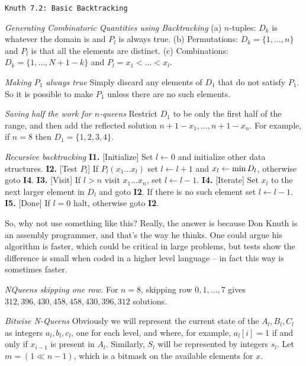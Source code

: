 \topglue 0.5in
\centerline{\tt Knuth 7.2: Basic Backtracking}
\vskip 0.3in

 {\it Generating Combinatoric Quantities using 
Backtracking}\hfil\break
(a) $n$-tuples: $D_k$ is whatever the domain is and $P_l$ is always 
true.\hfil\break 
(b) Permutations: $D_k = \{ 1, \ldots, n \}$ and $P_l$ is that all the elements 
are distinct.\hfil\break
(c) Combinations: $D_k = \{1, \ldots, N + 1 - k \}$ and 
$P_l = x_1 < \ldots < x_l$.\hfil\break

 {\it Making $P_1$ always true}\hfil\break
Simply discard any elements of $D_1$ that do not satisfy $P_1$.
So it is possible to make $P_1$ unless there are no such elements.

 {\it Saving half the work for $n$-queens}\hfil\break
Restrict $D_1$ to be only the first half of the range, and then add the 
reflected solution $n + 1 - x_1, \ldots, n + 1 - x_n$.  For example, if $n = 8$
then $D_1 = \{1, 2, 3, 4\}$.

 {\it Recursive backtracking}\hfil\break
{\bf I1.} [Initialize] Set $l \leftarrow 0$ and initialize other data 
structures.\hfil\break
{\bf I2.} [Test $P_l$] If $P_l\left(x_1 \ldots x_l\right)$ set 
 $l \leftarrow l + 1$ and $x_l \leftarrow {\rm min}\,D_l$,
  otherwise goto {\bf I4}.\hfil\break 
{\bf I3.} [Visit] If $l > n$ visit $x_1 \ldots x_n$, set $l \leftarrow l-1$.
\hfil\break
{\bf I4.} [Iterate] Set $x_l$ to the next larger element in $D_l$ and goto 
 {\bf I2}. If there is no such element set $l \leftarrow l - 1$.\hfil\break
{\bf I5.} [Done] If $l=0$ halt, otherwise goto {\bf I2}.
\hfil\break

So, why not use something like this?  Really, the answer is because Don Knuth
is an assembly programmer, and that's the way he thinks.  One could argue his
algorithm is faster, which could be critical in large problems, but tests show
the difference is small when coded in a higher level language -- in fact this
way is sometimes faster.

 {\it NQueens skipping one row.}\hfil\break
For $n=8$, skipping row $0, 1, \ldots, 7$ gives ${312, 396,
430, 458, 458, 430, 396, 312}$ solutions.

 {\it Bitwise N-Queens}\hfil\break
Obviously we will represent the current state of the $A_l, B_l, C_l$ 
as integers $a_l, b_l, c_l$, one for each level, and where, for example, 
$a_l\left[i\right] = 1$ if and only if $x_{i-1}$ is present in $A_l$.  
Similarly, $S_l$ will be represented by integers $s_l$.  Let 
$m = \left(1 \ll {n-1}\right)$, which is a bitmask on the available elements
for $x$.

